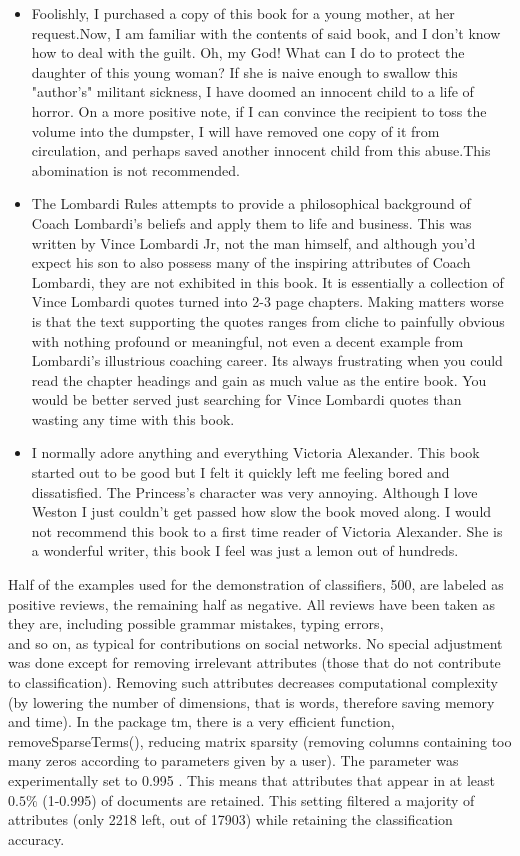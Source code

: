 \documentclass[10pt]{book}
\begin{document}
\begin{itemize}
  \item Foolishly, I purchased a copy of this book for a young mother, at her request.Now, I am familiar with the contents of said book, and I don't know how to deal with the guilt. Oh, my God! What can I do to protect the daughter of this young woman? If she is naive enough to swallow this "author's" militant sickness, I have doomed an innocent child to a life of horror. On a more positive note, if I can convince the recipient to toss the volume into the dumpster, I will have removed one copy of it from circulation, and perhaps saved another innocent child from this abuse.This abomination is not recommended.
  \item The Lombardi Rules attempts to provide a philosophical background of Coach Lombardi's beliefs and apply them to life and business. This was written by Vince Lombardi Jr, not the man himself, and although you'd expect his son to also possess many of the inspiring attributes of Coach Lombardi, they are not exhibited in this book. It is essentially a collection of Vince Lombardi quotes turned into 2-3 page chapters. Making matters worse is that the text supporting the quotes ranges from cliche to painfully obvious with nothing profound or meaningful, not even a decent example from Lombardi's illustrious coaching career. Its always frustrating when you could read the chapter headings and gain as much value as the entire book. You would be better served just searching for Vince Lombardi quotes than wasting any time with this book.
  \item I normally adore anything and everything Victoria Alexander. This book started out to be good but I felt it quickly left me feeling bored and dissatisfied. The Princess's character was very annoying. Although I love Weston I just couldn't get passed how slow the book moved along. I would not recommend this book to a first time reader of Victoria Alexander. She is a wonderful writer, this book I feel was just a lemon out of hundreds.
\end{itemize}

Half of the examples used for the demonstration of classifiers, 500, are labeled as positive reviews, the remaining half as negative. All reviews have been taken as they are, including possible grammar mistakes, typing errors,\\
and so on, as typical for contributions on social networks. No special adjustment was done except for removing irrelevant attributes (those that do not contribute to classification). Removing such attributes decreases computational complexity (by lowering the number of dimensions, that is words, therefore saving memory and time). In the package tm, there is a very efficient function, removeSparseTerms(), reducing matrix sparsity (removing columns containing too many zeros according to parameters given by a user). The parameter was experimentally set to 0.995 . This means that attributes that appear in at least $0.5 \%$ (1-0.995) of documents are retained. This setting filtered a majority of attributes (only 2218 left, out of 17903) while retaining the classification accuracy.
\end{document}
